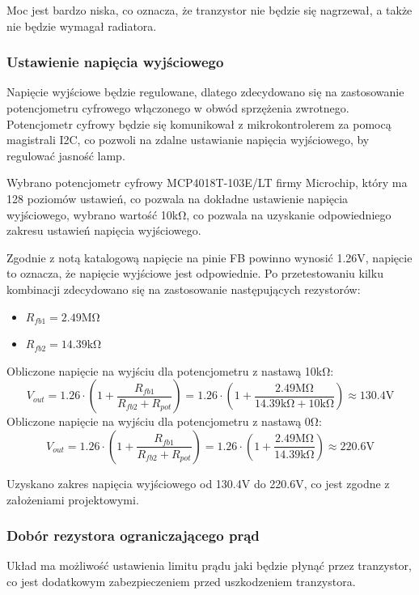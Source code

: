 \documentclass[../../main.tex]{subfiles}
\begin{document}
Moc jest bardzo niska, co oznacza, że tranzystor nie będzie się nagrzewał, a także nie będzie wymagał radiatora.

\subsubsection{Ustawienie napięcia wyjściowego}
Napięcie wyjściowe będzie regulowane, dlatego zdecydowano się na zastosowanie potencjometru cyfrowego włączonego w obwód sprzężenia zwrotnego.
Potencjometr cyfrowy będzie się komunikował z mikrokontrolerem za pomocą magistrali I2C, co pozwoli na zdalne ustawianie napięcia wyjściowego,
by regulować jasność lamp.

Wybrano potencjometr cyfrowy MCP4018T-103E/LT firmy Microchip,
który ma 128 poziomów ustawień, co pozwala na dokładne ustawienie napięcia wyjściowego,
wybrano wartość 10k\si{\ohm}, co pozwala na uzyskanie odpowiedniego zakresu ustawień napięcia wyjściowego.

Zgodnie z notą katalogową napięcie na pinie FB powinno wynosić 1.26\si{\volt}, napięcie to oznacza, że napięcie wyjściowe jest odpowiednie. 
Po przetestowaniu kilku kombinacji zdecydowano się na zastosowanie następujących rezystorów:
\begin{itemize}
    \item $R_{fb1} = 2.49\si{\mega\ohm}$
    \item $R_{fb2} = 14.39\si{\kilo\ohm}$
\end{itemize}

Obliczone napięcie na wyjściu dla potencjometru z nastawą 10\si{\kilo\ohm}:
\begin{equation}
    V_{out} = 1.26 \cdot (1 + \frac{R_{fb1}}{R_{fb2} + R_{pot}}) = 1.26 \cdot (1 + \frac{2.49\si{\mega\ohm}}{14.39\si{\kilo\ohm} + 10\si{\kilo\ohm}}) \approx 130.4\si{\volt}
\end{equation}
Obliczone napięcie na wyjściu dla potencjometru z nastawą 0\si{\ohm}:
\begin{equation}
    V_{out} = 1.26 \cdot (1 + \frac{R_{fb1}}{R_{fb2} + R_{pot}}) = 1.26 \cdot (1 + \frac{2.49\si{\mega\ohm}}{14.39\si{\kilo\ohm}}) \approx 220.6\si{\volt}
\end{equation}

Uzyskano zakres napięcia wyjściowego od 130.4\si{\volt} do 220.6\si{\volt}, co jest zgodne z założeniami projektowymi.

\subsubsection{Dobór rezystora ograniczającego prąd}
Układ ma możliwość ustawienia limitu prądu jaki będzie płynąć przez tranzystor,
co jest dodatkowym zabezpieczeniem przed uszkodzeniem tranzystora.
\end{document}

